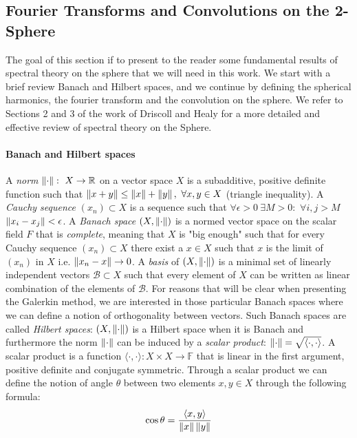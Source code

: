 \subsection{Fourier Transforms and Convolutions on the 2-Sphere}\label{sec:Fourier on the Sphere}
The goal of this section if to present to the reader some fundamental results of spectral theory on the sphere that we will need in this work. We start with a brief review Banach and Hilbert spaces, and we continue by defining the spherical harmonics, the fourier transform and the convolution on the sphere. We refer to Sections 2 and 3 of the work of Driscoll and Healy \cite{Driscoll:1994:CFT:184069.184073} for a more detailed and effective review of spectral theory on the Sphere.

\paragraph{Banach and Hilbert spaces}
A \textit{norm} $\left\lVert\cdot\right\rVert:\ X\to\mathbb R$ on a vector space $X$ is a subadditive, positive definite function such that $\left\lVert x+y\right\rVert\leq\left\lVert x\right\rVert +\left\lVert y\right\rVert,\ \forall x,y\in X$ (triangle inequality). A \textit{Cauchy sequence} $(x_n)\subset X$ is a sequence such that $\forall \epsilon>0\  \exists M>0: $ $\forall i,j>M$ $ \left\lVert x_i-x_j\right\rVert<\epsilon$. A \textit{Banach space} $(X, \left\lVert\cdot\right\rVert)$ is a normed vector space on the scalar field $F$ that is \textit{complete}, meaning that $X$ is "big enough" such that for every Cauchy sequence $(x_n)\subset X$ there exist a $x\in X$ such that $x$ is the limit of $(x_n)$ in $X$ i.e. $\left\lVert x_n-x\right\rVert\rightarrow 0$. A \textit{basis} of $(X, \left\lVert\cdot\right\rVert)$ is a minimal set of linearly independent vectors $\mathcal B \subset X$ such that every element of $X$ can be written as linear combination of the elements of $\mathcal B$. For reasons that will be clear when presenting the Galerkin method, we are interested in those particular Banach spaces where we can define a notion of orthogonality between vectors. Such Banach spaces are called \textit{Hilbert spaces}: $(X, \left\lVert\cdot\right\rVert )$ is a Hilbert space when it is Banach and furthermore the norm $ \left\lVert\cdot\right\rVert $ can be induced by a \textit{scalar product}: $\left\lVert\cdot\right\rVert = \sqrt{\langle\cdot,\cdot\rangle}$. A scalar product is a function $\langle\cdot,\cdot\rangle: X\times X \rightarrow \mathbb F$ that is linear in the first argument, positive definite and conjugate symmetric. Through a scalar product we can define the notion of angle $\theta$ between two elements $x, y \in X$ through the following formula: 
$$
\cos \theta = \frac{\langle x, y\rangle}{\left\lVert x\right\rVert \left\lVert y\right\rVert}
$$ 
